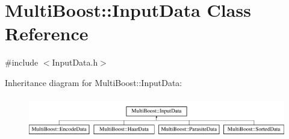 \hypertarget{classMultiBoost_1_1InputData}{\section{Multi\-Boost\-:\-:Input\-Data Class Reference}
\label{classMultiBoost_1_1InputData}
}


{\ttfamily \#include $<$Input\-Data.\-h$>$}

Inheritance diagram for Multi\-Boost\-:\-:Input\-Data\-:\begin{figure}[H]
\begin{center}
\leavevmode
\includegraphics[height=1.794872cm]{classMultiBoost_1_1InputData}
\end{center}
\end{figure}
